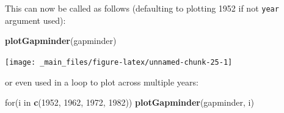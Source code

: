 \documentclass[]{book}
\newenvironment{Shaded}{\begin{snugshade}}{\end{snugshade}}
\newcommand{\KeywordTok}[1]{\textcolor[rgb]{0.13,0.29,0.53}{\textbf{{#1}}}}
\newcommand{\DataTypeTok}[1]{\textcolor[rgb]{0.13,0.29,0.53}{{#1}}}
\newcommand{\DecValTok}[1]{\textcolor[rgb]{0.00,0.00,0.81}{{#1}}}
\newcommand{\FloatTok}[1]{\textcolor[rgb]{0.00,0.00,0.81}{{#1}}}
\newcommand{\StringTok}[1]{\textcolor[rgb]{0.31,0.60,0.02}{{#1}}}
\newcommand{\NormalTok}[1]{{#1}}
\theoremstyle{definition}
\theoremstyle{definition}
\theoremstyle{definition}
\theoremstyle{remark}
\begin{document}
\begin{Shaded}
\end{Shaded}

This can now be called as follows (defaulting to plotting 1952 if not
\texttt{year} argument used):

\begin{Shaded}
\begin{Highlighting}[]
\KeywordTok{plotGapminder}\NormalTok{(gapminder)}
\end{Highlighting}
\end{Shaded}

\begin{center}\texttt{[image: \_main\_files/figure-latex/unnamed-chunk-25-1]} \end{center}

or even used in a loop to plot across multiple years:

\begin{Shaded}
\begin{Highlighting}[]
\NormalTok{for(i in }\KeywordTok{c}\NormalTok{(}\DecValTok{1952}\NormalTok{, }\DecValTok{1962}\NormalTok{, }\DecValTok{1972}\NormalTok{, }\DecValTok{1982}\NormalTok{)) }\KeywordTok{plotGapminder}\NormalTok{(gapminder, i)}
\end{Highlighting}
\end{Shaded}
\end{document}

